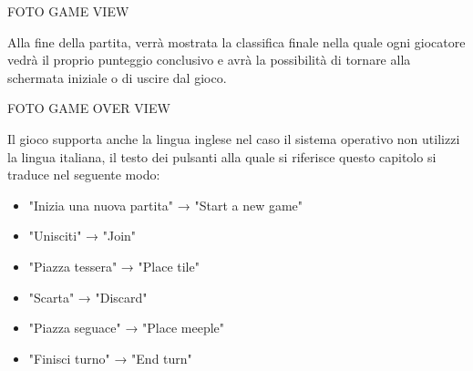 FOTO GAME VIEW

Alla fine della partita, verrà mostrata la classifica finale nella quale ogni giocatore vedrà il proprio punteggio conclusivo e avrà la possibilità di tornare alla schermata iniziale o di uscire dal gioco.

FOTO GAME OVER VIEW

Il gioco supporta anche la lingua inglese nel caso il sistema operativo non utilizzi la lingua italiana, il testo dei pulsanti alla quale si riferisce questo capitolo si traduce nel seguente modo:
\begin{itemize}
    \item "Inizia una nuova partita" → "Start a new game"
    \item "Unisciti" → "Join"
    \item "Piazza tessera" → "Place tile"
    \item "Scarta" → "Discard"
    \item "Piazza seguace" → "Place meeple"
    \item "Finisci turno" → "End turn"
\end{itemize}
